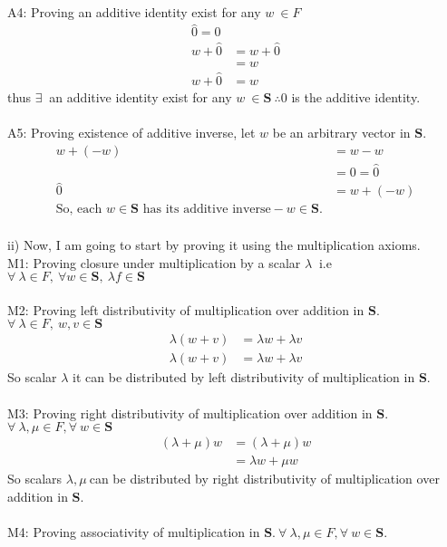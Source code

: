 \documentclass[10pt,a4paper]{article}
\numberwithin{equation}{section}
\begin{document}
~\\
A4: Proving an additive identity exist for any $w \ \in F$
\begin{align*}
	\hat{0}=0\\
	w+\hat{0}&=w+\hat{0} \\
	&=w\\
	w+\hat{0}&=w
\end{align*}
thus $\exists~$ an additive identity exist for any $w \ \in \mathbf{S}~ \therefore 0$ is the additive identity. \\
~\\
A5: Proving existence of additive inverse, let $w$ be an arbitrary vector in $\mathbf{S}$.
\begin{align*}
	w + (-w) &= w- w \\
	&= 0 = \hat{0}\\
	\hat{0} &= w + (-w) \\
	\text{So, each } w \in \mathbf{S}\text{ has its additive inverse} -w \in \mathbf{S}.
\end{align*}
~\\
ii) Now, I am going to start by proving it using the multiplication axioms.\\
M1: Proving closure under multiplication by a scalar $\lambda~$ i.e $\forall~ \lambda \in F,~\forall w \in \mathbf{S},~ \lambda f \in \mathbf{S}$ \\
~\\
M2: Proving left distributivity of multiplication
over addition in $\mathbf{S}$. $\forall ~\lambda \in F,~w,v \in\mathbf{S}$ \\
\begin{align*}
	\lambda(w+v) &= \lambda w+\lambda v \\
	\lambda(w+v) &=\lambda w+\lambda v
\end{align*}
So scalar $\lambda$ it can be distributed by left distributivity of multiplication in $\mathbf{S}$. \\
~\\
M3: Proving right distributivity of multiplication over addition in $\mathbf{S}$. $\forall ~\lambda,\mu \in F,\forall~w \in\mathbf{S}$
\begin{align*}
	(\lambda+\mu)w &=(\lambda+\mu)w \\
	&=\lambda w+\mu w 
\end{align*}
So scalars $\lambda,\mu~$can be distributed by right distributivity of multiplication over addition in $\mathbf{S}$. \\
~\\
M4: Proving associativity of multiplication in $\mathbf{S}$.$~\forall ~\lambda,\mu \in F,\forall~ w \in\mathbf{S}$. \\
\end{document}
